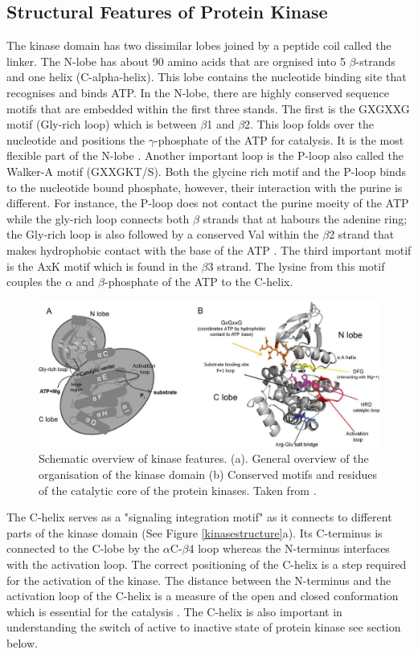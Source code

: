 \documentclass[a4paper, 11pt]{article}
\begin{document}
\subsection*{Structural Features of Protein Kinase}
The kinase domain has two dissimilar lobes joined by a peptide coil called the linker. The N-lobe has about 90 amino acids that are orgnised into 5 $\beta$-strands and one helix (C-alpha-helix). This lobe contains the nucleotide binding site that recognises and binds ATP. In the N-lobe, there are highly conserved sequence motifs that are embedded within the first three stands. The first is the GXGXXG motif (Gly-rich loop) which is between $\beta$1 and $\beta$2. This loop folds over the nucleotide and positions the  $\gamma$-phosphate of the ATP for catalysis. It is the most flexible part of the N-lobe \cite{taylor2011protein}. Another important loop is the P-loop also called the Walker-A motif (GXXGKT/S). Both the glycine rich motif and the P-loop binds to the nucleotide bound phosphate, however, their interaction with the purine is different. For instance, the P-loop does not contact the purine moeity of the ATP while the gly-rich loop connects both $\beta$ strands that at habours the adenine ring; the Gly-rich loop is also followed by a conserved Val within the $\beta$2 strand that makes hydrophobic contact with the base of the ATP \cite{fabbro2015ten}. The third important motif is the AxK motif which is found in the $\beta$3 strand. The lysine from this motif couples the $\alpha$ and $\beta$-phosphate of the ATP to the C-helix. \\
\begin{figure}[H]
	\includegraphics[width=\linewidth]{figures/kinasedom.jpg}
	\centering
	\caption{Schematic overview of kinase features. (a). General overview of the organisation of the kinase domain (b) Conserved motifs and residues of the catalytic core of the protein kinases. Taken from \cite{lorenzen2014hdx}.}
	\label{kinasedoms}
\end{figure}
The C-helix serves as a "signaling integration motif" as it connects to different parts of the kinase domain (See Figure \ref{kinasestructure}a). Its C-terminus is connected to the C-lobe by the $\alpha$C-$\beta$4 loop whereas the N-terminus interfaces with the activation loop. The correct positioning of the C-helix is a step required for the activation of the kinase. The distance between the N-terminus and the activation loop of the C-helix is a measure of the open and closed conformation which is essential for the catalysis \cite{taylor2011protein}. The C-helix is also important in understanding the switch of active to inactive state of protein kinase see section below.\\
\end{document}
